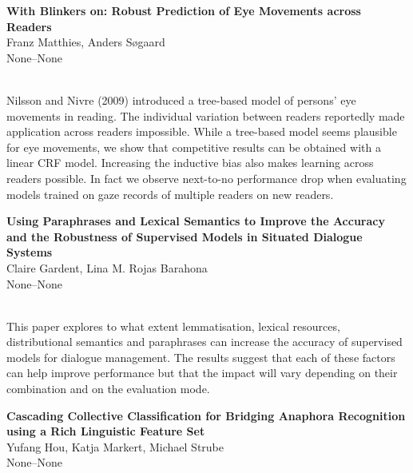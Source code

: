 \documentclass[twoside,makeidx]{book}
\begin{document}
\par\vspace{2em}\noindent%
\begin{minipage}{\linewidth}%
\begin{center}
\textbf{\normalsize With Blinkers on: Robust Prediction of Eye Movements across Readers}\\
\normalsize  Franz Matthies,  Anders S{\o}gaard\\
{\small None--None}\\
\end{center}
\end{minipage}\\[0.5em]
\nopagebreak%
\noindent%
{\small Nilsson and Nivre (2009) introduced a tree-based model of persons' eye movements in reading. The individual variation between readers reportedly made application across readers impossible. While a tree-based model seems plausible for eye movements, we show that competitive results can be obtained with a linear CRF model. Increasing the inductive bias also makes learning across readers possible. In fact we observe next-to-no performance drop when evaluating models trained on gaze records of multiple readers on new readers.}
\par\vspace{2em}\noindent%
\begin{minipage}{\linewidth}%
\begin{center}
\textbf{\normalsize Using Paraphrases and Lexical Semantics to Improve the Accuracy and the Robustness of Supervised Models in Situated Dialogue Systems}\\
\normalsize  Claire Gardent,  Lina M. Rojas Barahona\\
{\small None--None}\\
\end{center}
\end{minipage}\\[0.5em]
\nopagebreak%
\noindent%
{\small This paper explores to what extent lemmatisation, lexical resources, distributional semantics and paraphrases can increase the accuracy of  supervised models for dialogue management. The results suggest that  each of these factors can help improve performance but that the  impact will vary depending on their combination and on the evaluation  mode.}
\par\vspace{2em}\noindent%
\begin{minipage}{\linewidth}%
\begin{center}
\textbf{\normalsize Cascading Collective Classification for Bridging Anaphora Recognition using a Rich Linguistic Feature Set}\\
\normalsize  Yufang Hou,  Katja Markert,  Michael Strube\\
{\small None--None}\\
\end{center}
\end{minipage}\\[0.5em]
\end{document}
